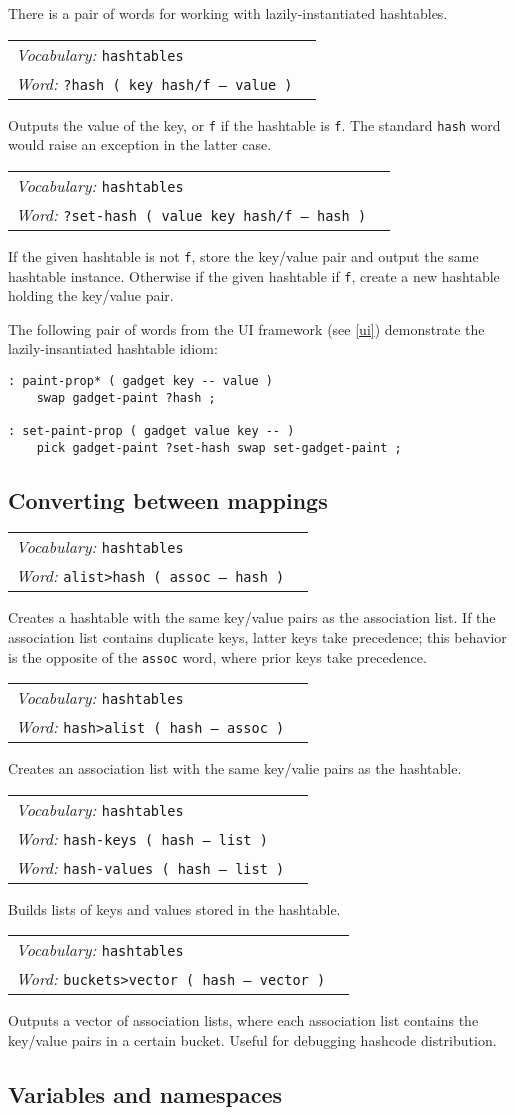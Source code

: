 \documentclass{book}
\newcommand{\vocabulary}[1]{\emph{Vocabulary:} \texttt{#1}&\\}
\newcommand{\ordinaryword}[2]{\index{\texttt{#1}}\emph{Word:} \texttt{#2}&\\}
\newcommand{\wordtable}[1]{


\begin{tabularx}{12cm}{lX}
\hline
#1
\hline
\end{tabularx}

}
\begin{document}
There is a pair of words for working with lazily-instantiated hashtables.

\wordtable{
\vocabulary{hashtables}
\ordinaryword{?hash}{?hash ( key hash/f -- value )}
}
Outputs the value of the key, or \texttt{f} if the hashtable is \texttt{f}. The standard \verb|hash| word would raise an exception in the latter case.

\wordtable{
\vocabulary{hashtables}
\ordinaryword{?set-hash}{?set-hash ( value key hash/f -- hash )}
}
If the given hashtable is not \verb|f|, store the key/value pair and output the same hashtable instance. Otherwise if the given hashtable if \verb|f|, create a new hashtable holding the key/value pair.

The following pair of words from the UI framework (see \ref{ui}) demonstrate the lazily-insantiated hashtable idiom:
\begin{verbatim}
: paint-prop* ( gadget key -- value )
    swap gadget-paint ?hash ;
    
: set-paint-prop ( gadget value key -- )
    pick gadget-paint ?set-hash swap set-gadget-paint ;
\end{verbatim}

\subsection{Converting between mappings}

\wordtable{
\vocabulary{hashtables}
\ordinaryword{alist>hash}{alist>hash ( assoc -- hash )}
}
Creates a hashtable with the same key/value pairs as the association list. If the association list contains duplicate keys, latter keys take precedence; this behavior is the opposite of the \texttt{assoc} word, where prior keys take precedence.
\wordtable{
\vocabulary{hashtables}
\ordinaryword{hash>alist}{hash>alist ( hash -- assoc )}
}
Creates an association list with the same key/valie pairs as the hashtable.
\wordtable{
\vocabulary{hashtables}
\ordinaryword{hash-keys}{hash-keys ( hash -- list )}
\ordinaryword{hash-values}{hash-values ( hash -- list )}
}
Builds lists of keys and values stored in the hashtable.
\wordtable{
\vocabulary{hashtables}
\ordinaryword{buckets>vector}{buckets>vector ( hash -- vector )}
}
Outputs a vector of association lists, where each association list contains the key/value pairs in a certain bucket. Useful for debugging hashcode distribution.

\subsection{Variables and namespaces}\label{namespaces}
\end{document}
